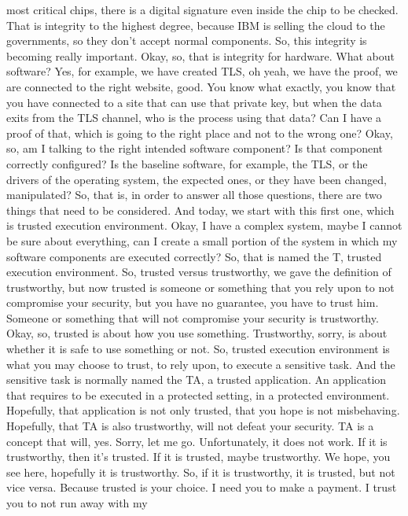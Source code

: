  most critical chips, there is a digital signature even inside the chip to be
 checked. That is integrity to the highest degree, because IBM is selling the
 cloud to the governments, so they don't accept normal components. So, this
 integrity is becoming really important. Okay, so, that is integrity for
 hardware. What about software? Yes, for example, we have created TLS, oh yeah,
 we have the proof, we are connected to the right website, good. You know what
 exactly, you know that you have connected to a site that can use that private
 key, but when the data exits from the TLS channel, who is the process using
 that data? Can I have a proof of that, which is going to the right place and
 not to the wrong one? Okay, so, am I talking to the right intended software
 component? Is that component correctly configured? Is the baseline software,
 for example, the TLS, or the drivers of the operating system, the expected
 ones, or they have been changed, manipulated? So, that is, in order to answer
 all those questions, there are two things that need to be considered. And
 today, we start with this first one, which is trusted execution environment.
 Okay, I have a complex system, maybe I cannot be sure about everything, can I
 create a small portion of the system in which my software components are
 executed correctly? So, that is named the T, trusted execution environment.
 So, trusted versus trustworthy, we gave the definition of trustworthy, but now
 trusted is someone or something that you rely upon to not compromise your
 security, but you have no guarantee, you have to trust him. Someone or
 something that will not compromise your security is trustworthy. Okay, so,
 trusted is about how you use something. Trustworthy, sorry, is about whether
 it is safe to use something or not. So, trusted execution environment is what
 you may choose to trust, to rely upon, to execute a sensitive task. And the
 sensitive task is normally named the TA, a trusted application. An application
 that requires to be executed in a protected setting, in a protected
 environment. Hopefully, that application is not only trusted, that you hope is
 not misbehaving. Hopefully, that TA is also trustworthy, will not defeat your
 security. TA is a concept that will, yes. Sorry, let me go. Unfortunately, it
 does not work. If it is trustworthy, then it's trusted. If it is trusted,
 maybe trustworthy. We hope, you see here, hopefully it is trustworthy. So, if
 it is trustworthy, it is trusted, but not vice versa. Because trusted is your
 choice. I need you to make a payment. I trust you to not run away with my
